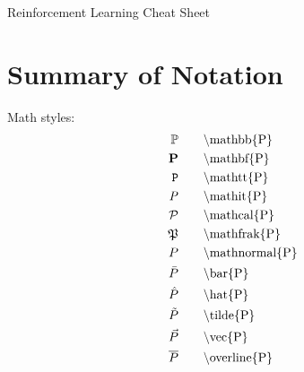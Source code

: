 \documentclass[10pt, landscape, a4paper]{article}
\begin{document}
    \raggedright
    \fontsize{\textfontsize}{\textfontsize}\selectfont



    \begin{multicols}{3}
        \setlength{\premulticols}{1pt}
        \setlength{\postmulticols}{0.1pt}
        \setlength{\multicolsep}{1pt}
        \setlength{\columnsep}{1pt}

        \begin{center}
            \Large{Reinforcement Learning Cheat Sheet} \\
        \end{center}

        \section*{Summary of Notation}
         {
            Math styles:
            \begin{align*}
                \mathbb{P}     &\qquad \text{\textbackslash mathbb\{P\}}     \\
                \mathbf{P}     &\qquad \text{\textbackslash mathbf\{P\}}     \\
                \mathtt{P}     &\qquad \text{\textbackslash mathtt\{P\}}     \\
                \mathit{P}     &\qquad \text{\textbackslash mathit\{P\}}     \\
                \mathcal{P}    &\qquad \text{\textbackslash mathcal\{P\}}    \\
                \mathfrak{P}   &\qquad \text{\textbackslash mathfrak\{P\}}   \\
                \mathnormal{P} &\qquad \text{\textbackslash mathnormal\{P\}} \\
                \bar{P}        &\qquad \text{\textbackslash bar\{P\}}        \\
                \hat{P}        &\qquad \text{\textbackslash hat\{P\}}        \\
                \tilde{P}      &\qquad \text{\textbackslash tilde\{P\}}      \\
                \vec{P}        &\qquad \text{\textbackslash vec\{P\}}        \\
                \overline{P}   &\qquad \text{\textbackslash overline\{P\}}   \\
            \end{align*}
        } {}


\end{multicols}
\end{document}
